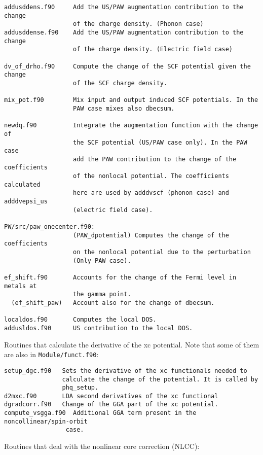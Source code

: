 \documentclass[12pt,a4paper]{article}
\begin{document}
\begin{verbatim}
addusddens.f90     Add the US/PAW augmentation contribution to the change 
                   of the charge density. (Phonon case)
addusddense.f90    Add the US/PAW augmentation contribution to the change 
                   of the charge density. (Electric field case)              

dv_of_drho.f90     Compute the change of the SCF potential given the change
                   of the SCF charge density.

mix_pot.f90        Mix input and output induced SCF potentials. In the
                   PAW case mixes also dbecsum.

newdq.f90          Integrate the augmentation function with the change of
                   the SCF potential (US/PAW case only). In the PAW case
                   add the PAW contribution to the change of the coefficients
                   of the nonlocal potential. The coefficients calculated
                   here are used by adddvscf (phonon case) and adddvepsi_us
                   (electric field case).

PW/src/paw_onecenter.f90: 
                   (PAW_dpotential) Computes the change of the coefficients 
                   on the nonlocal potential due to the perturbation
                   (Only PAW case).

ef_shift.f90       Accounts for the change of the Fermi level in metals at
                   the gamma point.
  (ef_shift_paw)   Account also for the change of dbecsum. 

localdos.f90       Computes the local DOS.
addusldos.f90      US contribution to the local DOS.               
\end{verbatim}

Routines that calculate the derivative of the xc potential.
Note that some of them are also in \texttt{Module/funct.f90}:

\begin{verbatim}
setup_dgc.f90   Sets the derivative of the xc functionals needed to
                calculate the change of the potential. It is called by
                phq_setup.
d2mxc.f90       LDA second derivatives of the xc functional            
dgradcorr.f90   Change of the GGA part of the xc potential.          
compute_vsgga.f90  Additional GGA term present in the noncollinear/spin-orbit
                 case.
\end{verbatim}

Routines that deal with the nonlinear core correction (NLCC):
\end{document}

